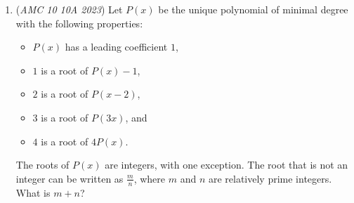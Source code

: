 \begin{enumerate}
 If $B$ is on only one of the corners, by Pigeonhole Principle this is not allowed. If $B$ is on two of the corners on the same line, then we can reach a configuration as shown in the problem statement. This has $4 \cdot 3 \cdot 2 \cdot 1 =24$ colorings. If the $B$ are diagonal yet the last two colors on the corners are different, then we see another plausible case, hence another $24$ cases. If the two $B$'s are diagonal, then the last two must also be diagonal, but by Pigeonhole Principle, no more slots remain that satisfy the problem. If three $B$'s are evident, then we have $\binom{4}{3}$ ways to place them, and one slot chosen in 2 ways for the last color. But now, by Pigeonhole, no good configuration can exist as two $B$'s will be in one two by two. Thus, the last case involving four $B$'s must happen, in which we are perfectly symmetric in sense of our colorings, that is, $4 \cdot 3 \cdot 2 = 24$ colorings. The answer is $3 \cdot 24 = \boxed{72}$.

 


	\item (\textit{AMC 10 10A 2023}) Let $P(x)$ be the unique polynomial of minimal degree with the following properties:


 
            \begin{itemize}
        \item $P(x)$ has a leading coefficient $1$,
            \end{itemize}
            
            \begin{itemize}
        \item $1$ is a root of $P(x)-1$,
            \end{itemize}
            
            \begin{itemize}
        \item $2$ is a root of $P(x-2)$,
            \end{itemize}
            
            \begin{itemize}
        \item $3$ is a root of $P(3x)$, and
            \end{itemize}
            
            \begin{itemize}
        \item $4$ is a root of $4P(x)$.
            \end{itemize}
            The roots of $P(x)$ are integers, with one exception. The root that is not an integer can be written as $\frac{m}{n}$, where $m$ and $n$ are relatively prime integers. What is $m+n$?



\end{enumerate}
